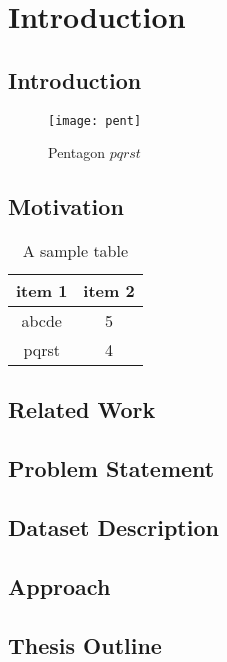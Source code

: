 \chapter{Introduction}


\section{Introduction}

\begin{figure}[here]
\begin{center}	
\texttt{[image: pent]} 
\caption{Pentagon $pqrst$}
\label{fig:pent}
\end{center}
\end{figure}


\section{Motivation}

\begin{table}
\centering
\begin{tabular}{| c | c |}
\hline
{\bf item 1} & {\bf item 2} \\ \hline
%
abcde & 5 \\ \hline
%
pqrst & 4 \\ \hline
\end{tabular}
\caption{A sample table}
\label{table:1}
\end{table}

\section{Related Work}
\section{Problem Statement}
\section{Dataset Description}
\section{Approach}
\section{Thesis Outline}

